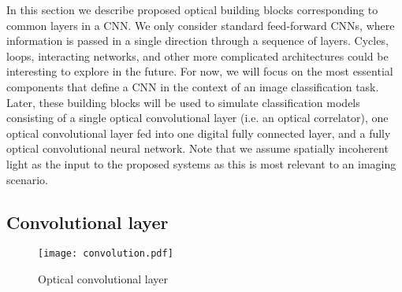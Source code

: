 

In this section we describe proposed optical building blocks corresponding to common layers in a CNN. We only consider standard feed-forward CNNs, where information is passed in a single direction through a sequence of layers. Cycles, loops, interacting networks, and other more complicated architectures could be interesting to explore in the future. For now, we will focus on the most essential components that define a CNN in the context of an image classification task. Later, these building blocks will be used to simulate classification models consisting of a single optical convolutional layer (i.e. an optical correlator), one optical convolutional layer fed into one digital fully connected layer, and a fully optical convolutional neural network. Note that we assume spatially incoherent light as the input to the proposed systems as this is most relevant to an imaging scenario.

\subsection*{Convolutional layer}

\begin{figure}[t]
\centering
\texttt{[image: convolution.pdf]}
\caption{Optical convolutional layer}
\label{fig:convolution}
\end{figure}

